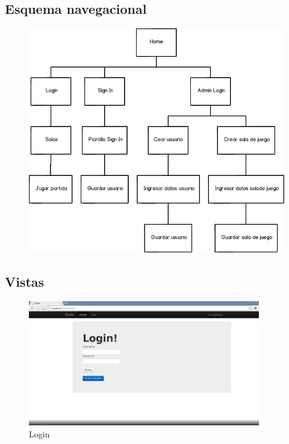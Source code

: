 \documentclass[a4paper,11pt]{article}
\begin{document}
\subsection{Esquema navegacional}
\begin{figure}[h]
	\centering
	\includegraphics[width=\textwidth]{Esquema_navegacional.png}
\end{figure}
\newpage

\subsection{Vistas}
\begin{figure}[h!]
	\centering
	\includegraphics[width=0.9\textwidth]{Login.png}
	\caption{Login}
\end{figure}
\end{document}
